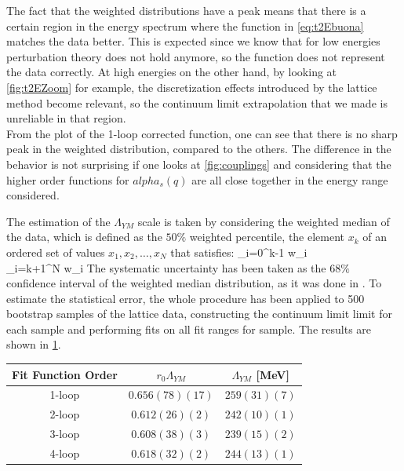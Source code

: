 The fact that the weighted distributions have a peak means that there is a certain region in the energy spectrum where the function in \cref{eq:t2Ebuona} matches the data better. This is expected since we know that for low energies perturbation theory does not hold anymore, so the function does not represent the data correctly. At high energies on the other hand, by looking at \cref{fig:t2EZoom} for example, the discretization effects introduced by the lattice method become relevant, so the continuum limit extrapolation that we made is unreliable in that region.\\
From the plot of the 1-loop corrected function, one can see that there is no sharp peak in the weighted distribution, compared to the others. The difference in the behavior is not surprising if one looks at \cref{fig:couplings} and considering that the higher order functions for $alpha_s(q)$ are all close together in the energy range considered. 

The estimation of the $\Lambda_{YM}$ scale is taken by considering the weighted median of the data, which is defined as the $50\%$ weighted percentile, the element $x_k$ of an ordered set of values $x_1, x_2, \dots, x_N$ that satisfies:
\beq
    \sum_{i=0}^{k-1} w_i \leq {} ~~~~   ~~~~~ \sum_{i=k+1}^{N} w_i \geq {}
\eeq
The systematic uncertainty has been taken as the $68\%$ confidence interval of the weighted median distribution, as it was done in \cite{durr_ab-initio_2008-1}. To estimate the statistical error, the whole procedure has been applied to 500 bootstrap samples of the lattice data, constructing the continuum limit limit for each sample and performing fits on all fit ranges for sample. The results are shown in \cref{table:lambda_table}.

\begin{table}[!htb]
    \begin{center}
        \begin{tabular}{ccc} 
            Fit Function Order & $r_0\Lambda_{YM}$ & $\Lambda_{YM}$ [MeV] \\\hline
            1-loop & $0.656(78)(17)$ & $259(31)(7)$ \\
            2-loop & $0.612(26)(2)$ & $242(10)(1)$  \\
            3-loop & $0.608(38)(3)$ & $239(15)(2)$  \\
            4-loop & $0.618(32)(2)$ & $244(13)(1)$  
        \end{tabular}
        \label{table:lambda_table} 
    \end{center} 
\end{table}

